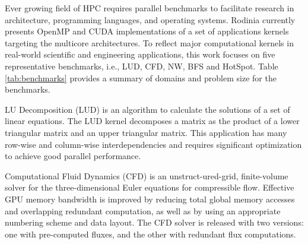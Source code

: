 
Ever growing field of HPC requires parallel benchmarks to facilitate research in architecture, programming languages, and operating systems. Rodinia currently presents OpenMP and CUDA implementations of a set of applications kernels targeting the multicore architectures. To reflect major computational kernels in real-world scientific and engineering applications, this work focuses on five representative benchmarks, i.e., LUD, CFD, NW, BFS and HotSpot. Table \ref{tab:benchmarks} provides a summary of domains and problem size for the benchmarks. 


LU Decomposition (LUD) is an algorithm to calculate the solutions of a set of linear equations. The LUD kernel decomposes a matrix as the product of a lower triangular matrix and an upper triangular matrix. This application has many row-wise and column-wise interdependencies and requires significant optimization to achieve good parallel performance.



Computational Fluid Dynamics (CFD) is an unstruct-ured-grid, finite-volume solver for the three-dimensional Euler equations for compressible flow. Effective GPU memory bandwidth is improved by reducing total global memory accesses and overlapping redundant computation, as well as by using an appropriate numbering scheme and data layout. The CFD solver is released with two versions: one with pre-computed fluxes, and the other with redundant flux computations.


